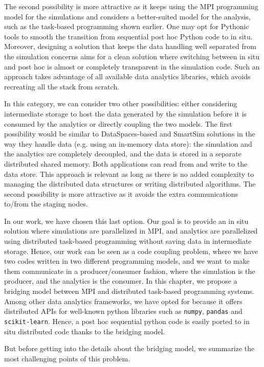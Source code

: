 The second possibility is more attractive as it keeps using the MPI programming model for the simulations and considers a better-suited model for the analysis, such as the task-based programming shown earlier. One may opt for Pythonic tools to smooth the transition from sequential post hoc Python code to in situ. Moreover, designing a solution that keeps the data handling well separated from the simulation concerns aims for a clean solution where switching between in situ and post hoc is almost or completely transparent in the simulation code. Such an approach takes advantage of all available data analytics libraries, which avoids recreating all the stack from scratch.

In this category, we can consider two other possibilities: either considering intermediate storage to host the data generated by the simulation before it is consumed by the analytics or directly coupling the two models.  
The first possibility would be similar to DataSpaces-based and SmartSim solutions in the way they handle data (e.g. using an in-memory data store): the simulation and the analytics are completely decoupled, and the data is stored in a separate distributed shared memory. Both applications can read from and write to the data store. This approach is relevant as long as there is no added complexity to managing the distributed data structures or writing distributed algorithms. 
The second possibility is more attractive as it avoids the extra communications to/from the staging nodes. 

In our work, we have chosen this last option. 
Our goal is to provide an in situ solution where simulations are parallelized in MPI, and analytics are parallelized using distributed task-based programming without saving data in intermediate storage. Hence, our work can be seen as a code coupling problem, where we have two codes written in two different programming models, and we want to make them communicate in a producer/consumer fashion, where the simulation is the producer, and the analytics is the consumer.
In this chapter, we propose a bridging model between MPI and \dask distributed task-based programming systems. 
Among other data analytics frameworks, we have opted for \dask because it offers distributed APIs for well-known python libraries such as \texttt{numpy}, \texttt{pandas} and \texttt{scikit-learn}. Hence, a post hoc sequential python code is easily ported to in situ distributed \dask code thanks to the bridging model. 

But before getting into the details about the bridging model, we summarize the most challenging points of this problem.

